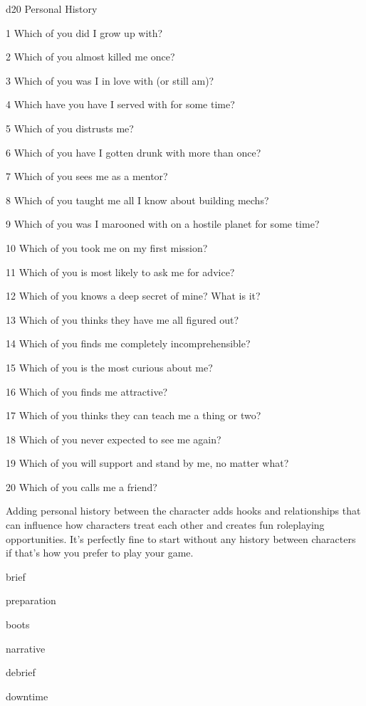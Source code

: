  d20       Personal	History

 1         Which of you did I grow up with?

 2         Which of you almost killed me once?

 3         Which of you was I in love with (or still am)?

 4         Which have you have I served with for some time?

 5         Which of you distrusts me?

 6         Which of you have I gotten drunk with more than once?

 7         Which of you sees me as a mentor?

 8         Which of you taught me all I know about building mechs?

 9         Which of you was I marooned with on a hostile planet for some time?

10       Which of you took me on my first mission?

  11       Which of you is most likely to ask me for advice?

  12       Which of you knows a deep secret of mine? What is it?

  13       Which of you thinks they have me all figured out?

  14       Which of you finds me completely incomprehensible?

  15       Which of you is the most curious about me?

  16       Which of you finds me attractive?

  17       Which of you thinks they can teach me a thing or two?

  18       Which of you never expected to see me again?

  19       Which of you will support and stand by me, no matter what?

  20       Which of you calls me a friend?

Adding personal history between the character adds hooks and relationships that can influence
how characters treat each other and creates fun roleplaying opportunities. It’s perfectly fine to
start without any history between characters if that’s how you prefer to play your game.

{brief}

{preparation}

{boots}

{narrative}

{debrief}

{downtime}
